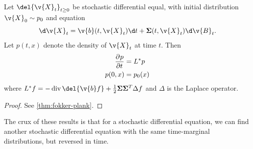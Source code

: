\begin{theorem}
	\label{thm:fokker-plank_background}
	Let \(\del{\v{X}_t}_{t\geq 0}\) be stochastic differential equal, with initial distribution \(\v{X}_0  \sim p_0\) and equation \[\d \v{X}_t = \v{b}(t, \v{X}_t) \d t + \m{\Sigma}(t, \v{X}_t) \d\v{B}_t.\]
	Let \(p(t, x)\) denote the density of \(\v{X}_t\) at time \(t\).
	Then 
	\begin{align}
		\pd{p}{t} &= L^* p \nonumber \\
		p(0, x) &= p_0(x)
	\end{align}
	where \(L^* f = -\dive \del{\v{b}f} + \frac{1}{2} \m{\Sigma}\m{\Sigma}^T \Delta f\) and \(\Delta\) is the Laplace operator.
\end{theorem}
\begin{proof}
	See \cref{thm:fokker-plank}.
\end{proof}

The crux of these results is that for a stochastic differential equation, we can find another stochastic differential equation with the same time-marginal distributions, but reversed in time.

